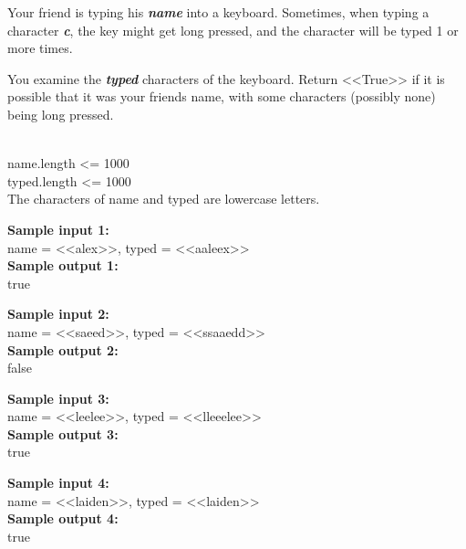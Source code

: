 \documentclass[a4paper]{article}
\begin{document}
Your friend is typing his \textit{\textbf{name}} into a keyboard.  Sometimes, when typing a character  \textit{\textbf{c}}, the key might get long pressed, and the character will be typed 1 or more times.

You examine the \textit{\textbf{typed}} characters of the keyboard.  Return <<True>> if it is possible that it was your friends name, with some characters (possibly none) being long pressed.

\ \\
name.length <= 1000\\
typed.length <= 1000\\
The characters of name and typed are lowercase letters.

\LINE

\noindent \textbf{Sample input 1:}\\
name = <<alex>>, typed = <<aaleex>>\\


\noindent \textbf{Sample output 1:}\\
true


\SPACE

\noindent \textbf{Sample input 2:}\\
name = <<saeed>>, typed = <<ssaaedd>>\\


\noindent \textbf{Sample output 2:}\\
false


\SPACE

\noindent \textbf{Sample input 3:}\\
name = <<leelee>>, typed = <<lleeelee>>\\


\noindent \textbf{Sample output 3:}\\
true


\SPACE

\noindent \textbf{Sample input 4:}\\
name = <<laiden>>, typed = <<laiden>>\\


\noindent \textbf{Sample output 4:}\\
true
\end{document}
